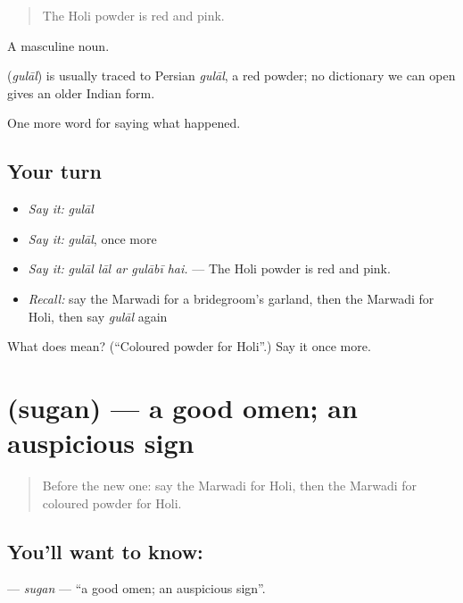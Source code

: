 \begin{quote}
The Holi powder is red and pink.
\end{quote}

A masculine noun.

\begin{cousinweb}
\textbf{} (\emph{gulāl}) is usually traced to Persian \emph{gulāl}, a red powder; no dictionary we can open gives an older Indian form.
\end{cousinweb}

\begin{grammarlens}[title={What you've built}]
One more word for saying what happened.
\end{grammarlens}

\subsection*{Your turn}
\begin{itemize}
\raggedright
  \item \emph{Say it:} \emph{gulāl}
  \item \emph{Say it:} \emph{gulāl}, once more
  \item \emph{Say it:} \emph{gulāl lāl ar gulābī hai.} — The Holi powder is red and pink.
  \item \emph{Recall:} say the Marwadi for a bridegroom's garland, then the Marwadi for Holi, then say \emph{gulāl} again
\end{itemize}

\begin{tcolorbox}[breakable,colback=teal!4,colframe=teal!35!black,title={Before you move on}]
What does  mean? (\textquotedblleft{}Coloured powder for Holi\textquotedblright{}.) Say it once more.
\end{tcolorbox}
\section[\texorpdfstring{\mw{सुगन} (sugan)}{सुगन (sugan)}]{ (sugan) — a good omen; an auspicious sign}

\label{lesson:MW-C249-sugan}



\begin{quote}
Before the new one: say the Marwadi for Holi, then the Marwadi for coloured powder for Holi.
\end{quote}

\subsection*{You'll want to know: }
\textbf{} — \emph{sugan} — \textquotedblleft{}a good omen; an auspicious sign\textquotedblright{}.

